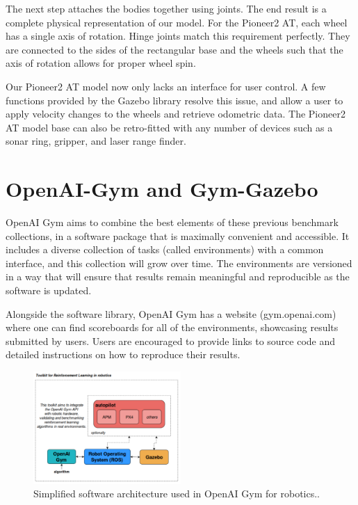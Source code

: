The next step attaches the bodies together using joints. The end result is a complete physical representation of our model. For the Pioneer2 AT, each wheel has a single axis of rotation. Hinge joints match this requirement perfectly. They are connected to the sides of the rectangular base and the wheels such that the axis of rotation allows for proper wheel spin.

Our Pioneer2 AT model now only lacks an interface for user control. A few functions provided by the Gazebo library resolve this issue, and allow a user to apply velocity changes to the wheels and retrieve odometric data. The Pioneer2 AT model base can also be retro-fitted with any number of devices such as a sonar ring, gripper, and laser range finder.

\section{OpenAI-Gym and Gym-Gazebo}

OpenAI Gym aims to combine the best elements of these previous benchmark collections, in a software package that is maximally convenient and accessible. It includes a diverse collection of tasks (called environments) with a common interface, and this collection will grow over time. The environments are versioned in a way that will ensure that results remain meaningful and reproducible as the software is updated.

Alongside the software library, OpenAI Gym has a website (gym.openai.com) where one can find scoreboards for all of the environments, showcasing results submitted by users. Users are encouraged to provide links to source code and detailed instructions on how to reproduce their results.

\begin{figure}[h]
\centering
\includegraphics[width=0.5\textwidth]{figs/ch2/toolkit-of-openaigym}
\caption{Simplified software architecture used in OpenAI Gym for robotics..}
\end{figure}

